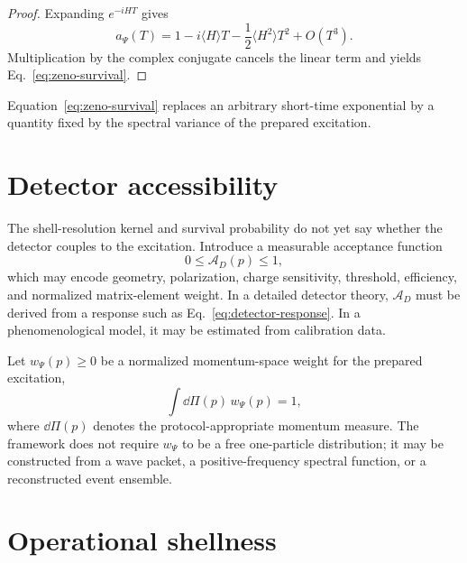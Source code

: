 \documentclass[11pt]{article}
\theoremstyle{remark}
\newcommand{\Access}{\mathcal A}
\begin{document}
\begin{proof}
Expanding $e^{-iHT}$ gives
\begin{equation}
 a_\Psi(T)=1-i\langle H\rangle T-\frac12\langle H^2\rangle T^2+O(T^3).
\end{equation}
Multiplication by the complex conjugate cancels the linear term and yields Eq.~\eqref{eq:zeno-survival}.
\end{proof}

Equation~\eqref{eq:zeno-survival} replaces an arbitrary short-time exponential by a quantity fixed by the spectral variance of the prepared excitation.


\section{Detector accessibility}

The shell-resolution kernel and survival probability do not yet say whether the detector couples to the excitation. Introduce a measurable acceptance function
\begin{equation}
  0\le \Access_D(p)\le1,
  \label{eq:acceptance}
\end{equation}
which may encode geometry, polarization, charge sensitivity, threshold, efficiency, and normalized matrix-element weight. In a detailed detector theory, $\Access_D$ must be derived from a response such as Eq.~\eqref{eq:detector-response}. In a phenomenological model, it may be estimated from calibration data.

Let $w_\Psi(p)\ge0$ be a normalized momentum-space weight for the prepared excitation,
\begin{equation}
  \int \dd\Pi(p)\,w_\Psi(p)=1,
  \label{eq:packet-normalization}
\end{equation}
where $\dd\Pi(p)$ denotes the protocol-appropriate momentum measure. The framework does not require $w_\Psi$ to be a free one-particle distribution; it may be constructed from a wave packet, a positive-frequency spectral function, or a reconstructed event ensemble.

\section{Operational shellness}
\end{document}

